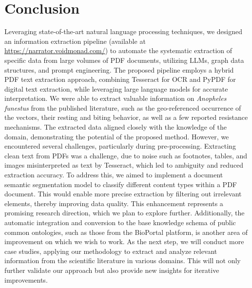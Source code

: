 \documentclass{article}
\begin{document}
\section{Conclusion}
\label{sec:conclusion}
Leveraging state-of-the-art natural language processing techniques, we designed an information extraction 
pipeline (available at \url{https://narrator.voidmonad.com/}) to automate the systematic extraction of 
specific data from large volumes of PDF documents, utilizing LLMs, graph data structures, and prompt 
engineering. The proposed pipeline employs a hybrid PDF text extraction approach, combining Tesseract 
for OCR and PyPDF for digital text extraction, while leveraging large language models for accurate 
interpretation. We were able to extract valuable information on \textit{Anopheles funestus} from the 
published literature, such as the geo-referenced occurrence of the vectors, their resting and biting 
behavior, as well as a few reported resistance mechanisms. The extracted data aligned closely with the 
knowledge of the domain, demonstrating the potential of the proposed method. However, we encountered 
several challenges, particularly during pre-processing. Extracting clean text from PDFs was a challenge, 
due to noise such as footnotes, tables, and images misinterpreted as text by Tesseract, which led to 
ambiguity and reduced extraction accuracy. To address this, we aimed to implement a document semantic 
segmentation model to classify different content types within a PDF document. This would enable more 
precise extraction by filtering out irrelevant elements, thereby improving data quality. This enhancement 
represents a promising research direction, which we plan to explore further. Additionally, the automatic 
integration and conversion to the base knowledge schema of public common ontologies, such as those from the 
BioPortal platform, is another area of improvement on which we wish to work. As the next step, we will 
conduct more case studies, applying our methodology to extract and analyze relevant information from the 
scientific literature in various domains. This will not only further validate our approach but also provide 
new insights for iterative improvements.
\end{document}
